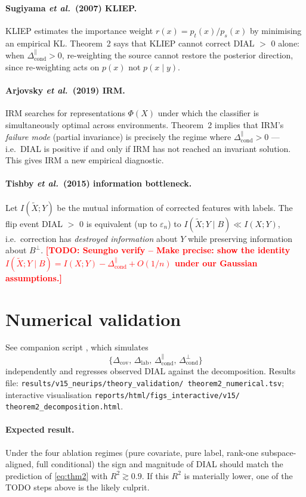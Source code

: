 \documentclass[11pt,a4paper]{article}
\newcommand{\TODO}[1]{\textbf{\textcolor{red}{[TODO: Seungho verify -- #1]}}}
\begin{document}
\paragraph{Sugiyama \emph{et al.}\ (2007) KLIEP.}
KLIEP estimates the importance weight
$r(x)=p_t(x)/p_s(x)$ by minimising an empirical KL. Theorem~2 says
that KLIEP cannot correct DIAL $>$ 0 alone: when
$\Delta_{\text{cond}}^{\parallel}>0$, re-weighting the source cannot
restore the posterior direction, since re-weighting acts on
$p(x)$ not $p(x\mid y)$.

\paragraph{Arjovsky \emph{et al.}\ (2019) IRM.}
IRM searches for representations $\Phi(X)$ under which the classifier
is simultaneously optimal across environments. Theorem~2 implies that
IRM's \emph{failure mode} (partial invariance) is precisely the regime
where $\Delta_{\text{cond}}^{\parallel}>0$ --- i.e.\ DIAL is positive
if and only if IRM has not reached an invariant solution. This gives
IRM a new empirical diagnostic.

\paragraph{Tishby \emph{et al.}\ (2015) information bottleneck.}
Let $I(\tilde X;Y)$ be the mutual information of corrected features
with labels. The flip event DIAL $>$ 0 is equivalent (up to
$\varepsilon_n$) to $I(\tilde X;Y\mid B)\ll I(X;Y)$, i.e.\ correction
has \emph{destroyed information} about $Y$ while preserving information
about $B^\perp$. \TODO{Make precise: show the identity
$I(\tilde X;Y\mid B) = I(X;Y) - \Delta_{\text{cond}}^{\parallel}+O(1/n)$
under our Gaussian assumptions.}

\section{Numerical validation}

See companion script
\texttt{},
which simulates
\[
   \{\Delta_{\text{cov}},\,\Delta_{\text{lab}},\,
    \Delta_{\text{cond}}^{\parallel},\,
    \Delta_{\text{cond}}^{\perp}\}
\]
independently and regresses observed DIAL against the decomposition.
Results file: \texttt{results/v15\_neurips/theory\_validation/
theorem2\_numerical.tsv}; interactive visualisation
\texttt{reports/html/figs\_interactive/v15/
theorem2\_decomposition.html}.

\paragraph{Expected result.}
Under the four ablation regimes (pure covariate, pure label, rank-one
subspace-aligned, full conditional) the sign and magnitude of DIAL
should match the prediction of \eqref{eq:thm2} with
$R^{2}\gtrsim 0.9$. If this $R^{2}$ is materially lower, one of the
TODO steps above is the likely culprit.
\end{document}
